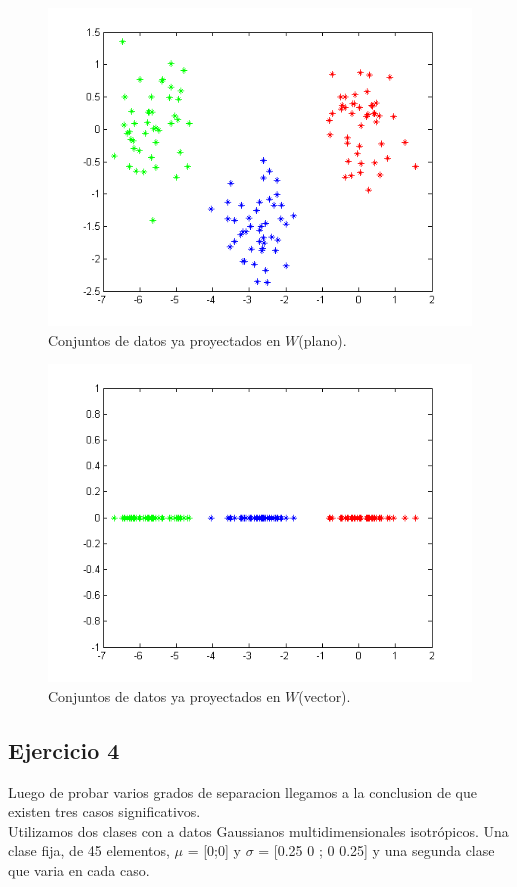 \begin{figure}[ht!]
\centering
\includegraphics[width=120mm]{img/tp4/ej3-4.png}
\caption{Conjuntos de datos ya proyectados en $W$(plano).}
\end{figure}

\begin{figure}[ht!]
\centering
\includegraphics[width=120mm]{img/tp4/ej3-5.png}
\caption{Conjuntos de datos ya proyectados en $W$(vector).}
\end{figure}

\subsection{Ejercicio 4}

Luego de probar varios grados de separacion llegamos a la conclusion de que existen tres casos significativos.\\
Utilizamos dos clases con a datos Gaussianos multidimensionales
isotrópicos. Una clase fija, de 45 elementos, $\mu$ = [0;0] y $\sigma$ = [0.25 0 ; 0 0.25] y una segunda clase que varia en cada caso.

